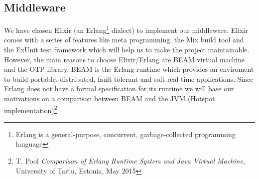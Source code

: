 \subsection{Middleware}
We have chosen Elixir (an Erlang\footnote{Erlang is a general-purpose, 
concurrent, garbage-collected programming language} dialect) to implement 
our middleware. Elixir comes with a series of features like meta programming, 
the Mix build tool and the ExUnit test framework which will help us to make 
the project maintainable.
However, the main reasons to choose Elixir/Erlang are BEAM virtual machine 
and the OTP library.
BEAM is the Erlang runtime which provides an enviroment to build portable, 
distributed, fault-tolerant and soft real-time applications.
Since Erlang does not have a formal specification for its runtime we will
 base our motivations on a comparison between BEAM and the JVM 
(Hotspot implementation)\footnote{T. Pool \textit{Comparison of Erlang Runtime 
System and Java Virtual Machine}, University of Tartu, Estonia, May 2015}.

